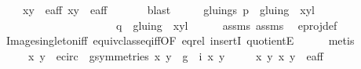 \begin{isabellebody}
\ \ \ \ {\isachardoublequoteopen}{\isacharparenleft}x{\isacharcomma}y{\isacharparenright}\ {\isasymin}\ e{\isacharunderscore}aff{\isachardoublequoteclose}\ {\isachardoublequoteopen}{\isacharparenleft}x{\isacharprime}{\isacharcomma}y{\isacharprime}{\isacharparenright}\ {\isasymin}\ e{\isacharunderscore}aff{\isachardoublequoteclose}\ \isanewline
\ \ \ \ \isamarkupfalse%
\ blast\isanewline
\ \ \isamarkupfalse%
\ \isamarkupfalse%
\ gluings{\isacharcolon}\ {\isachardoublequoteopen}p\ {\isacharequal}\ {\isacharparenleft}gluing\ {\isacharbackquote}{\isacharbackquote}\ {\isacharbraceleft}{\isacharparenleft}{\isacharparenleft}x{\isacharcomma}y{\isacharparenright}{\isacharcomma}l{\isacharparenright}{\isacharbraceright}{\isacharparenright}{\isachardoublequoteclose}\ \isanewline
\ \ \ \ \ \ \ \ \ \ \ \ \ \ \ \ \ \ \ \ \ {\isachardoublequoteopen}q\ {\isacharequal}\ {\isacharparenleft}gluing\ {\isacharbackquote}{\isacharbackquote}\ {\isacharbraceleft}{\isacharparenleft}{\isacharparenleft}x{\isacharprime}{\isacharcomma}y{\isacharprime}{\isacharparenright}{\isacharcomma}l{\isacharprime}{\isacharparenright}{\isacharbraceright}{\isacharparenright}{\isachardoublequoteclose}\isanewline
\ \ \ \ \isamarkupfalse%
\ assms{\isacharparenleft}{}{\isacharparenright}\ assms{\isacharparenleft}{}{\isacharparenright}\ \isamarkupfalse%
\ e{\isacharunderscore}proj{\isacharunderscore}def\ \isanewline
\ \ \ \ \isamarkupfalse%
\ Image{\isacharunderscore}singleton{\isacharunderscore}iff\ equiv{\isacharunderscore}class{\isacharunderscore}eq{\isacharunderscore}iff{\isacharbrackleft}OF\ eq{\isacharunderscore}rel{\isacharbrackright}\ insertI{}\ quotientE\isanewline
\ \ \ \ \isamarkupfalse%
\ metis{\isacharplus}\isanewline
\ \ \isamarkupfalse%
\ \isanewline
\ \ \ \ \ {\isachardoublequoteopen}{\isacharparenleft}x{\isacharcomma}\ y{\isacharparenright}\ {\isasymin}\ e{\isacharunderscore}circ\ {\isasymand}\ {\isacharparenleft}{\isasymexists}g{\isasymin}symmetries{\isachardot}\ {\isacharparenleft}x{\isacharprime}{\isacharcomma}\ y{\isacharprime}{\isacharparenright}\ {\isacharequal}\ {\isacharparenleft}g\ {\isasymcirc}\ i{\isacharparenright}\ {\isacharparenleft}x{\isacharcomma}\ y{\isacharparenright}{\isacharparenright}{\isachardoublequoteclose}\ \isanewline
\ \ \ {\isacharbar}\ {\isachardoublequoteopen}{\isacharparenleft}{\isacharparenleft}x{\isacharcomma}\ y{\isacharparenright}{\isacharcomma}\ x{\isacharprime}{\isacharcomma}\ y{\isacharprime}{\isacharparenright}\ {\isasymin}\ e{\isacharunderscore}aff{\isacharunderscore}{}{\isachardoublequoteclose}\ \isanewline

\end{isabellebody}
